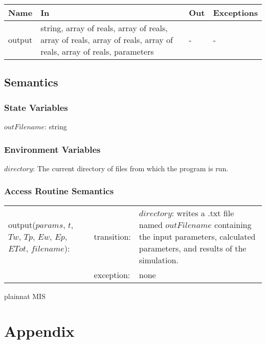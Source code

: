 \documentclass[12pt]{article}
\begin{document}
\begin{center}
\begin{tabular}{p{3cm} p{7cm} p{2cm} p{2cm}}
\hline
\textbf{Name} & \textbf{In} & \textbf{Out} & \textbf{Exceptions} \\
\hline
output & string, array of reals, array of reals, array of reals, array of reals, array of reals, array of reals, parameters & - & - \\
\hline
\end{tabular}
\end{center}

\subsection{Semantics}

\subsubsection{State Variables}

$outFilename$: string

\subsubsection{Environment Variables}

$directory$: The current directory of files from which the program is run.

\subsubsection{Access Routine Semantics}

\begin{center}
\begin{tabular}{l l p{4cm}}
output($params$, $t$, $Tw$, $Tp$, $Ew$, $Ep$, $ETot$, $filename$): & transition: & $directory$: writes a .txt file named $outFilename$ containing the input parameters, calculated parameters, and results of the simulation. \\
& exception: & none \\
\end{tabular}
\end{center}

 {plainnat}
 {MIS}

\section{Appendix} \label{Appendix}
\end{document}
